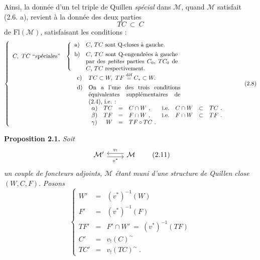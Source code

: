 \documentclass[11pt]{article}
\newcommand{\printedpage}[1]{\marginpar{\footnotesize p.~#1}}
\newcommand{\msp}[1]{\marginpar{\footnotesize [#1]}}
\newcommand{\M}{\mathcal{M}}
\newcommand{\Fl}{\mathrm{Fl}}
\begin{document}
Ainsi, la donnée d'un tel triple de Quillen \textit{spécial} dans $\M$, quand $\M$ satisfait (2.6. a), revient à la donnée des deux parties
\msp{page 15}
\[
TC \ \subset\ C
\tag*{(2.7)}
\]
de $\Fl(\M)$, satisfaisant les conditions :
\[
\left\{
\begin{array}{ll}
C,\ TC\ \text{“spéciales”} &
\left\{\begin{array}{ll}
\text{a)} & \text{$C$, $TC$ sont Q-closes à gauche.}\\[1ex]
\text{b)} & \parbox[t]{0.45\textwidth}{$C$, $TC$ sont Q-engendrées à gauche par des \textit{petites} parties $C_0$, $TC_0$ de $C$, $TC$ respectivement.}
\end{array}\right.\\[5ex]
 & \quad\ \begin{array}{ll}
\text{c)} & TC \subset W,\ TF \overset{\text{déf}}{=} C_* \subset W.\\[1ex]
\text{d)} & \parbox[t]{0.45\textwidth}{On a l'une des trois conditions équivalentes supplémentaires de (2.4), i.e. :}\\[5ex]
 & \begin{array}{lrcllrcl}
\alpha) & TC & = & C \cap W\ , & \text{i.e.} & C \cap W & \subset & TC\ .\\
\beta) & TF & = & F \cap W\ , & \text{i.e.} & F \cap W & \subset & TF\ .\\
\gamma) & W & = & TF \circ TC\ . & & & &
\end{array}
\end{array}
\end{array}\right.
\tag*{(2.8)}
\]

\printedpage{10}

\textbf{Proposition 2.1.} \textit{Soit}
\[
\begin{tikzcd}
\M' \arrow[r, shift right, "v^*"'] & \M \arrow[l, shift right, "v_!"']
\end{tikzcd}
\tag*{(2.11)} %
\]
\textit{un couple de foncteurs adjoints, $\M$ étant muni d'une structure de Quillen close} $(W,C,F)$. \textit{Posons}
\[
\left\{
\begin{array}{rcl}
W' & = & (v^*)^{-1}(W)\\
F' & = & (v^*)^{-1}(F)\\
TF' & = & F' \cap W' \ = \ (v^*)^{-1}(TF)\\
C' & = & v_!(C)^{\sim}\\
TC' & = & v_!(TC)^{\sim}\ .
\end{array}\right.
\tag*{(2.1.2)}
\]
\end{document}
